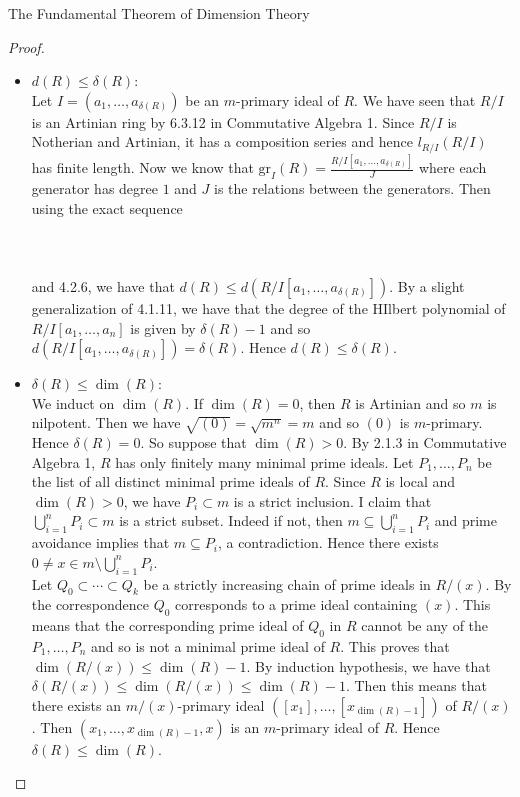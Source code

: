 \documentclass[a4paper]{article}
\begin{document}
\begin{thm}{The Fundamental Theorem of Dimension Theory}{}
\begin{proof}
\begin{itemize}
\item $d(R)\leq\delta(R)$: \\
Let $I=(a_1,\dots,a_{\delta(R)})$ be an $m$-primary ideal of $R$. We have seen that $R/I$ is an Artinian ring by 6.3.12 in Commutative Algebra 1. Since $R/I$ is Notherian and Artinian, it has a composition series and hence $l_{R/I}(R/I)$ has finite length. Now we know that $\text{gr}_I(R)=\frac{R/I[a_1,\dots,a_{\delta(R)}]}{J}$ where each generator has degree $1$ and $J$ is the relations between the generators. Then using the exact sequence \\~\\
\\~\\
and 4.2.6, we have that $d(R)\leq d(R/I[a_1,\dots,a_{\delta(R)}])$. By a slight generalization of 4.1.11, we have that the degree of the HIlbert polynomial of $R/I[a_1,\dots,a_n]$ is given by $\delta(R)-1$ and so $d(R/I[a_1,\dots,a_{\delta(R)}])=\delta(R)$. Hence $d(R)\leq\delta(R)$. 

\item $\delta(R)\leq\dim(R)$: \\
We induct on $\dim(R)$. If $\dim(R)=0$, then $R$ is Artinian and so $m$ is nilpotent. Then we have $\sqrt{(0)}=\sqrt{m^n}=m$ and so $(0)$ is $m$-primary. Hence $\delta(R)=0$. So suppose that $\dim(R)>0$. By 2.1.3 in Commutative Algebra 1, $R$ has only finitely many minimal prime ideals. Let $P_1,\dots,P_n$ be the list of all distinct minimal prime ideals of $R$. Since $R$ is local and $\dim(R)>0$, we have $P_i\subset m$ is a strict inclusion. I claim that $\bigcup_{i=1}^nP_i\subset m$ is a strict subset. Indeed if not, then $m\subseteq\bigcup_{i=1}^nP_i$ and prime avoidance implies that $m\subseteq P_i$, a contradiction. Hence there exists $0\neq x\in m\setminus\bigcup_{i=1}^nP_i$. \\

Let $Q_0\subset\cdots\subset Q_k$ be a strictly increasing chain of prime ideals in $R/(x)$. By the correspondence $Q_0$ corresponds to a prime ideal containing $(x)$. This means that the corresponding prime ideal of $Q_0$ in $R$ cannot be any of the $P_1,\dots,P_n$ and so is not a minimal prime ideal of $R$. This proves that $\dim(R/(x))\leq\dim(R)-1$. By induction hypothesis, we have that $\delta(R/(x))\leq\dim(R/(x))\leq\dim(R)-1$. Then this means that there exists an $m/(x)$-primary ideal $([x_1],\dots,[x_{\dim(R)-1}])$ of $R/(x)$. Then $(x_1,\dots,x_{\dim(R)-1},x)$ is an $m$-primary ideal of $R$. Hence $\delta(R)\leq\dim(R)$. 
\end{itemize}
\end{proof}
\end{thm}
\end{document}
